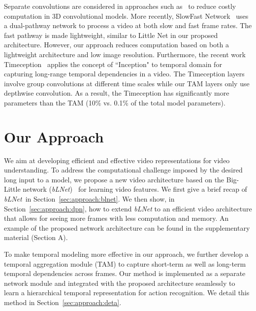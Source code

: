 \documentclass{article}
\def\blnet{\textit{bLNet}\xspace}
\begin{document}
Separate convolutions are considered in approaches such as~\cite{S3D:xie2018rethinking, R(2+1)D:tran2018closer} to reduce costly computation in 3D convolutional models. More recently, SlowFast Network~\cite{SlowFast:feichtenhofer2018slowfast} uses a dual-pathway network to process a video at both slow and fast frame rates. The fast pathway is made lightweight, similar to Little Net in our proposed architecture. However, our approach reduces computation based on both a lightweight architecture and low image resolution.
Furthermore, the recent work Timeception~\cite{Timeception} applies the concept of ``Inception" to temporal domain for capturing long-range temporal dependencies in a video. The Timeception layers involve group convolutions at different time scales while our TAM layers only use depthwise convolution. As a result, the Timeception has significantly more parameters than the TAM (10\% vs. 0.1\% of the total model parameters).

 \section{Our Approach}
\label{sec:approach}
We aim at developing efficient and effective video representations for video understanding.
To address the computational challenge imposed by the desired long input to a model, we propose a new video architecture based on the Big-Little network (\blnet)~\cite{chen2018biglittle} for learning video features.
We first give a brief recap of \blnet~in Section~\ref{sec:approach:blnet}. 
We then show, in Section~\ref{sec:approach:dpn}, how to extend \blnet to an efficient video architecture that allows for seeing more frames with less computation and memory. An example of the proposed network architecture can be found in the supplementary material (Section A).

To make temporal modeling more effective in our approach, we further develop a temporal aggregation module (TAM) to capture short-term as well as long-term temporal dependencies across frames. Our method is implemented as a separate network module and integrated with the proposed architecture seamlessly to learn a hierarchical temporal representation for action recognition. We detail this method in Section~\ref{sec:approach:deta}.
\end{document}
